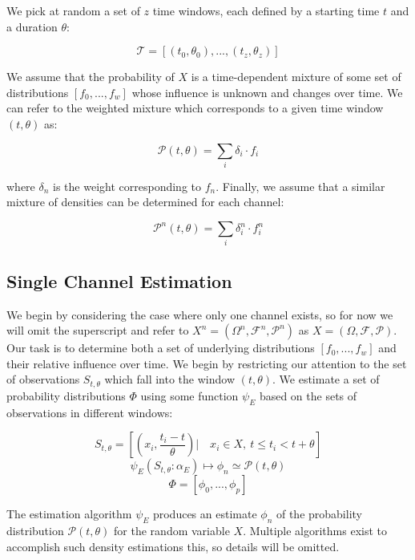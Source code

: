 \documentclass[10pt]{article}
\begin{document}
We pick at random a set of \( z \) time windows, each defined by a starting time \( t \) and a duration \( \theta \):

\[  \mathcal{T} = [(t_0,\theta_0),...,(t_z,\theta_z) ] \]

We assume that the probability of \(X \) is a time-dependent mixture of some set of distributions \( [f_0,...,f_w] \) whose influence is unknown and changes over time.  We can refer to the weighted mixture which corresponds to a given time window \( (t,\theta) \) as:

\begin{equation} \mathcal{P}(t,\theta) = \sum_i \delta_i \cdot f_i \end{equation}

where \( \delta_n \) is the weight corresponding to \( f_n \).  Finally, we assume that a similar mixture of densities can be determined for each channel:

\begin{equation} \mathcal{P}^n(t,\theta) = \sum_i \delta_i^n \cdot f_i^n \end{equation}

\subsection{Single Channel Estimation}
We begin by considering the case where only one channel exists, so for now we will omit the superscript and refer to \(X^n = (\Omega^n,\mathcal{F}^n,\mathcal{P}^n) \) as \(X = (\Omega, \mathcal{F},\mathcal{P}) \).  Our task is to determine both a set of underlying distributions \([f_0,...,f_w] \) and their relative influence over time.  We begin by restricting our attention to the set of observations \( S_{t,\theta} \) which fall into the window \( (t,\theta) \).  We estimate a set of probability distributions \(\Phi \) using some function \(\psi_E \) based on the sets of observations in different windows:

\begin{equation} S_{t,\theta} = \left[ \left( x_i,\frac{t_i - t}{\theta} \right) | \quad x_i \in X, \ t \le t_i < t+\theta \right] \end{equation}
\begin{equation} \psi_E( S_{t,\theta}:\alpha_E ) \mapsto \phi_n \simeq \mathcal{P}(t,\theta)  \end{equation}
\[ \Phi = [\phi_0,...,\phi_p ] \nonumber \]

The estimation algorithm \(\psi_{E} \) produces an estimate \(\phi_n \) of the probability distribution \( \mathcal{P}(t,\theta) \) for the random variable \( X \).  Multiple algorithms exist to accomplish such density estimations this, so details will be omitted.
\end{document}
